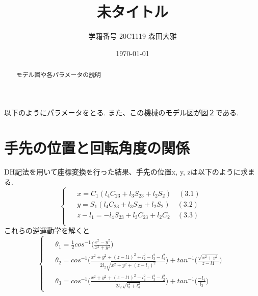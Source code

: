 \documentclass[a4j]{jarticle}			%
\title{未タイトル}
\author{学籍番号 20C1119 森田大雅}
\date{\today}
\begin{document}
\maketitle %
\small


\begin{abstract}
モデル図や各パラメータの説明
\end{abstract}


\begin{multicols}{2} %


以下のようにパラメータをとる. また、この機械のモデル図が図２である.

\small
\section{手先の位置と回転角度の関係}
DH記法を用いて座標変換を行った結果、手先の位置x, y, zは以下のように求まる.
\begin{equation*}
	\left\{
		\begin{array}{c}
		\begin{split}
			&x=C_1(l_4C_{23}+l_3S_{23}+l_2S_2)\quad(3.1) \\
			&y=S_1(l_4C_{23}+l_3S_{23}+l_2S_2)\quad(3.2) \\
			&z-l_1=-l_4S_{23}+l_3C_{23}+l_2C_2\quad(3.3) \\
		\end{split}
	\end{array}
	\right.
\end{equation*}
これらの逆運動学を解くと
\tiny
\begin{equation*}
\left\{
	\begin{array}{c}
	\begin{split}
		&\theta_1=\frac{1}{2}cos^{-1}\biggl( \frac{x^2-y^2}{x^2+y^2} \biggr) \\
		&\theta_2= cos^{-1}\biggl( \frac{x^2+y^2+(z-l1)^2+l_2^2-l_3^2-l_4^2}{2l_2\sqrt{x^2+y^2+(z-l_1)^2}} \biggr)+tan^{-1}\biggl( \frac{\sqrt{x^2+y^2}}{z-l1}\biggr) \\
		&\theta_3=cos^{-1}\biggl( \frac{x^2+y^2+(z-l1)^2-l_4^2-l_3^2-l_2^2}{2l_2\sqrt{l_3^2+l_4^2}}\biggr)+tan^{-1}\biggl( \frac{-l_4}{l_3}\biggr)
	\end{split}
	\end{array}
\right.
\end{equation*}
\small

\end{multicols}
\end{document}
